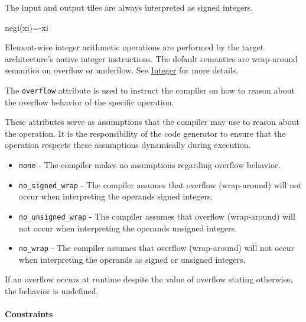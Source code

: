 \documentclass{article}
\begin{document}
The input and output tiles are always interpreted as signed integers.


negi(xi)=-xi

Element-wise integer arithmetic operations are performed by the target architecture's native integer instructions. The default semantics are wrap-around semantics on overflow or underflow. See \href{https://docs.nvidia.com/cuda/tile-ir/latest/sections/operations.html#op-group-integer}{Integer} for more details.


The \texttt{overflow} attribute is used to instruct the compiler on how to reason about the overflow behavior of the specific operation.


These attributes serve as assumptions that the compiler may use to reason about the operation. It is the responsibility of the code generator to ensure that the operation respects these assumptions dynamically during execution.


\begin{itemize}
\item \texttt{none} - The compiler makes no assumptions regarding overflow behavior.
\item \texttt{no\_signed\_wrap} - The compiler assumes that overflow (wrap-around) will not occur when interpreting the operands signed integers.
\item \texttt{no\_unsigned\_wrap} - The compiler assumes that overflow (wrap-around) will not occur when interpreting the operands unsigned integers.
\item \texttt{no\_wrap} - The compiler assumes that overflow (wrap-around) will not occur when interpreting the operands as signed or unsigned integers.

\end{itemize}
If an overflow occurs at runtime despite the value of overflow stating otherwise, the behavior is undefined.



\paragraph{Constraints}
\end{document}
